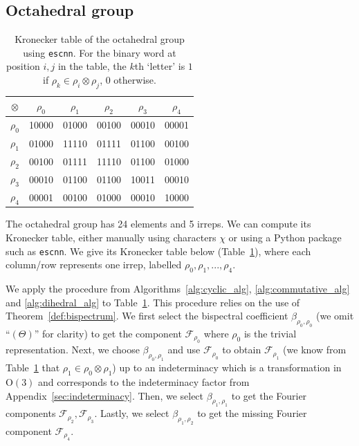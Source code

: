 \documentclass{article}
\theoremstyle{plain}
\theoremstyle{definition}
\theoremstyle{remark}
\begin{document}
\subsection{Octahedral group}
\begin{table}
        \centering
        \begin{tabular}{|c||c|c|c|c|c|}
            \hline
            $\otimes$ &$\rho_0$&$\rho_1$&$\rho_2$&$\rho_3$&$\rho_4$\\
            \hline
            \hline
            $\rho_0$&10000 & 01000 & 00100 & 00010 & 00001 \\
            \hline
            $\rho_1$&01000 & 11110 & 01111 & 01100 & 00100 \\
            \hline
            $\rho_2$&00100 & 01111 & 11110 & 01100 & 01000 \\
            \hline
            $\rho_3$&00010 & 01100 & 01100 & 10011 & 00010 \\
            \hline
            $\rho_4$ &00001 & 00100 & 01000 & 00010 & 10000 \\
            \hline
        \end{tabular}
        \caption{Kronecker table of the octahedral group using \texttt{escnn}. For the binary word at position $i,j$ in the table, the $k$th `letter' is $1$ if $\rho_k\in\rho_i\otimes \rho_j$, $0$ otherwise.}
        \label{tab:octa}
    \end{table}

The octahedral group has 24 elements and 5 irreps. We can compute its Kronecker table, either manually using characters $\chi$ or using a Python package such as \texttt{escnn}. We give its Kronecker table below (Table~\ref{tab:octa}), where each column/row represents one irrep, labelled $\rho_0, \rho_1, ..., \rho_4$.

We apply the procedure from Algorithms~\ref{alg:cyclic_alg}, \ref{alg:commutative_alg} and \ref{alg:dihedral_alg} to Table~\ref{tab:octa}. This procedure relies on the use of Theorem~\ref{def:bispectrum}. We first select the bispectral coefficient $\beta_{\rho_0, \rho_0}$ (we omit ``$(\Theta)$'' for clarity) to get the component $\mathcal{F}_{\rho_0 }$ where $\rho_0$ is the trivial representation. Next, we choose $\beta_{\rho_0,\rho_1}$ and use $\mathcal{F}_{\rho_0}$  to obtain $\mathcal{F}_{\rho_1}$ (we know from Table~\ref{tab:octa} that $\rho_1\in\rho_0\otimes\rho_1$) up to an indeterminacy which is a transformation in $\mathrm{O}(3)$ and corresponds to the indeterminacy factor from Appendix~\ref{sec:indeterminacy}. Then, we select  $\beta_{\rho_1, \rho_1}$ to get the Fourier components $\mathcal{F}_{\rho_2}, \mathcal{F}_{\rho_3}$. Lastly, we select $\beta_{\rho_1, \rho_2}$ to get the missing Fourier component $\mathcal{F}_{\rho_4}$.
\end{document}
